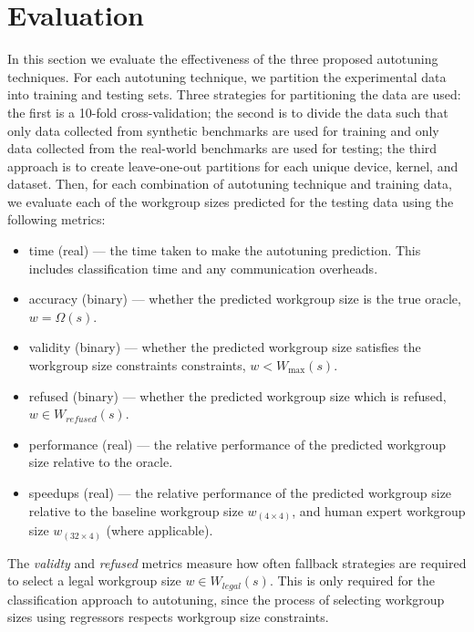 \documentclass[nonatbib,preprint,10pt]{sigplanconf}
\begin{document}
\section{Evaluation}

In this section we evaluate the effectiveness of the three proposed
autotuning techniques. For each autotuning technique, we partition the
experimental data into training and testing sets. Three strategies for
partitioning the data are used: the first is a 10-fold
cross-validation; the second is to divide the data such that only data
collected from synthetic benchmarks are used for training and only
data collected from the real-world benchmarks are used for testing;
the third approach is to create leave-one-out partitions for each
unique device, kernel, and dataset. Then, for each combination of
autotuning technique and training data, we evaluate each of the
workgroup sizes predicted for the testing data using the following
metrics:
%
\begin{itemize}
\item time (real) --- the time taken to make the autotuning
  prediction. This includes classification time and any communication
  overheads.
\item accuracy (binary) --- whether the predicted workgroup size is
  the true oracle, $w = \Omega(s)$.
\item validity (binary) --- whether the predicted workgroup size
  satisfies the workgroup size constraints constraints,
  $w < W_{\max}(s)$.
\item refused (binary) --- whether the predicted workgroup size which
  is refused, $w \in W_{refused}(s)$.
\item performance (real) --- the relative performance of the predicted
  workgroup size relative to the oracle.
\item speedups (real) --- the relative performance of the predicted
  workgroup size relative to the baseline workgroup size
  $w_{(4 \times 4)}$, and human expert workgroup size
  $w_{(32 \times 4)}$ (where applicable).
\end{itemize}
%
The \emph{validty} and \emph{refused} metrics measure how often
fallback strategies are required to select a legal workgroup size
$w \in W_{legal}(s)$. This is only required for the classification
approach to autotuning, since the process of selecting workgroup sizes
using regressors respects workgroup size constraints.
\end{document}
